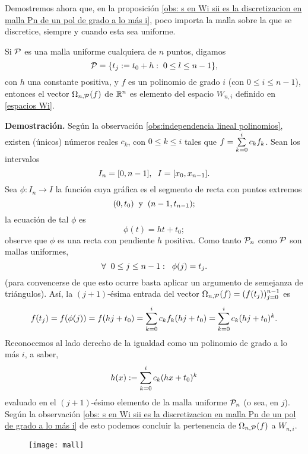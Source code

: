 \noindent Demostremos ahora que,
en la proposición
\ref{obs: s en Wi sii es la discretizacion en malla Pn de un pol de grado a lo más i},
poco importa
la malla sobre la que se discretice, siempre y
cuando esta sea uniforme.


\begin{prop} \label{Obs1}
Si $\mathcal{P}$ es una malla
uniforme cualquiera de $n$ puntos, digamos
\[
\mathcal{P}= \{ t_{j}:= t_{0}+h :\hspace{0.1cm} 0 \leq l \leq n-1 \},
\]
con $h$ una constante positiva, 
y $f$ es un polinomio de grado $i$
(con $0 \leq i \leq n-1$),
entonces el vector $\Omega_{n, \mathcal{P}}(f)$ de $\mathbb{R}^{n}$ 
es elemento del espacio $W_{n,i}$ definido en 
\eqref{espacios Wi}.
\end{prop}
\noindent
\textbf{Demostración.}
Según la observación \ref{obs:independencia lineal polinomios},
existen 
(únicos) números reales $c_{k}$, con $0 \leq k \leq i$
tales que 
$f= \sum\limits_{k=0}^{i}c_{k}f_{k}$.
Sean los intervalos
\[
I_{n}=[0,n-1], \hspace{0.2cm} I=[x_{0}, x_{n-1}].
\]
Sea $\phi:I_{n} \longrightarrow I$ la función cuya gráfica
es el segmento de recta con puntos extremos 
\[
(0, t_{0}) \hspace{0.2cm} \text{y} \hspace{0.2cm}
(n-1, t_{n-1});
\]
la ecuación de tal $\phi$ es
\[
\phi(t)=ht+t_{0};
\] observe que $\phi$
es una recta con pendiente $h$ positiva.
Como tanto
$\mathcal{P}_{n}$ como $\mathcal{P}$
son mallas uniformes, 
\[
\forall \hspace{0.2cm} 0 \leq j \leq n-1: \hspace{0.2cm} \phi(j)=t_{j}.
\] 
(para convencerse de que esto ocurre
basta aplicar un argumento de semejanza de triángulos).
\noindent Así, la $(j+1)$-ésima entrada del
vector $\Omega_{n, \mathcal{P}}(f)=(f(t_{j}))_{j=0}^{n-1}$ es
\[
f(t_{j})= f (\phi (j))=
f(hj+t_{0})=
\sum\limits_{k=0}^{i}c_{k}f_{k}(hj+t_{0})
= \sum\limits_{k=0}^{i}c_{k}(hj+t_{0})^{k}.
\]
Reconocemos al lado derecho de la igualdad como un polinomio
de grado a lo más $i$, a saber,
\[
h(x):= \sum\limits_{k=0}^{i}c_{k}(hx+t_{0})^{k}
\]
evaluado en el $(j+1)$-ésimo elemento 
de la malla uniforme $\mathcal{P}_{n}$
(o sea, en $j$). Según la observación
\ref{obs: s en Wi sii es la discretizacion en malla Pn de un pol de grado a lo más i}
de esto podemos concluir la pertenencia de 
$\Omega_{n, \mathcal{P}}(f)$ a $W_{n,i}$. \\

\begin{figure}[H]
	\texttt{[image: mall]} 
 \end{figure}
\QEDB
\vspace{0.2cm}

